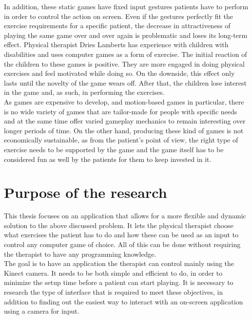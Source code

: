 In addition, these static games have fixed input gestures patients have to perform in order to control the action on screen. Even if the gestures perfectly fit the exercise requirements for a specific patient, the decrease in attractiveness of playing the same game over and over again is problematic and loses its long-term effect. Physical therapist Dries Lamberts has experience with children with disabilities and uses computer games as a form of exercise. The initial reaction of the children to these games is positive. They are more engaged in doing physical exercises and feel motivated while doing so. On the downside, this effect only lasts until the novelty of the game wears off. After that, the children lose interest in the game and, as such, in performing the exercises.\\

As games are expensive to develop, and motion-based games in particular, there is no wide variety of games that are tailor-made for people with specific needs and at the same time offer varied gameplay mechanics to remain interesting over longer periods of time. On the other hand, producing these kind of games is not economically sustainable, as from the patient's point of view, the right type of exercise needs to be supported by the game and the game itself has to be considered fun as well by the patients for them to keep invested in it.\\


\section{Purpose of the research}

This thesis focuses on an application that allows for a more flexible and dynamic solution to the above discussed problem. It lets the physical therapist choose what exercises the patient has to do and how these can be used as an input to control any computer game of choice. All of this can be done without requiring the therapist to have any programming knowledge.\\

The goal is to have an application the therapist can control mainly using the Kinect camera. It needs to be both simple and efficient to do, in order to minimize the setup time before a patient can start playing. It is necessary to research the type of interface that is required to meet these objectives, in addition to finding out the easiest way to interact with an on-screen application using a camera for input.